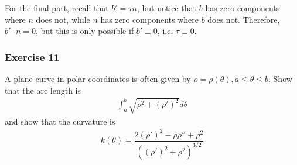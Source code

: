 \documentclass{article}
\begin{document}
	For the final part, recall that $b' = \tau n$, but notice that $b$ has zero components where $n$ does not, while $n$ has zero components where $b$ does not. Therefore, $b' \cdot n = 0$, but this is only possible if $b' \equiv 0$, i.e. $\tau \equiv 0$.

	\subsubsection*{Exercise 11}
	A plane curve in polar coordinates is often given by $\rho = \rho(\theta), a \leq \theta \leq b$. Show that the arc length is 
	\begin{gather*}
		\int_a^b \sqrt{ \rho^2 + (\rho')^2 } d\theta
	\end{gather*}
	and show that the curvature is
	\begin{gather*}
		k(\theta) = \dfrac{ 2(\rho')^2 - \rho \rho'' + \rho^2 }{ \left( (\rho')^2 + \rho^2 \right)^{3/2} }
	\end{gather*}
\end{document}
